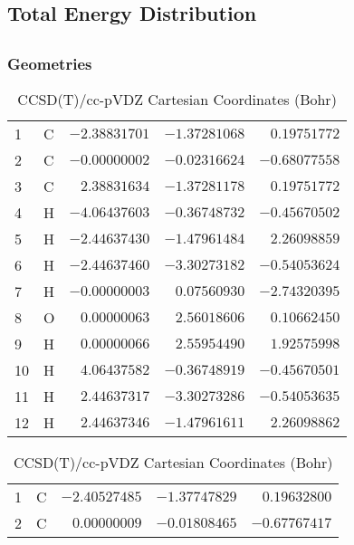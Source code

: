 \documentclass[10pt,oneside]{article}
\begin{document}
\begin{table}
\subsection*{Total Energy Distribution}
\centering\end{table}

\clearpage

\subsection{}

\begin{table}[h!]
\subsubsection*{Geometries}
\begin{multicols}{2}
\centering
\caption{CCSD(T)/cc-pVTZ Cartesian Coordinates (Bohr)}
\begin{tabular}{llrrr}
\toprule
1  & C  & $-2.38831701$ & $-1.37281068$ & $ 0.19751772$ \\
2  & C  & $-0.00000002$ & $-0.02316624$ & $-0.68077558$ \\
3  & C  & $ 2.38831634$ & $-1.37281178$ & $ 0.19751772$ \\
4  & H  & $-4.06437603$ & $-0.36748732$ & $-0.45670502$ \\
5  & H  & $-2.44637430$ & $-1.47961484$ & $ 2.26098859$ \\
6  & H  & $-2.44637460$ & $-3.30273182$ & $-0.54053624$ \\
7  & H  & $-0.00000003$ & $ 0.07560930$ & $-2.74320395$ \\
8  & O  & $ 0.00000063$ & $ 2.56018606$ & $ 0.10662450$ \\
9  & H  & $ 0.00000066$ & $ 2.55954490$ & $ 1.92575998$ \\
10 & H  & $ 4.06437582$ & $-0.36748919$ & $-0.45670501$ \\
11 & H  & $ 2.44637317$ & $-3.30273286$ & $-0.54053635$ \\
12 & H  & $ 2.44637346$ & $-1.47961611$ & $ 2.26098862$ \\
\bottomrule
\end{tabular}
\caption{CCSD(T)/cc-pVDZ Cartesian Coordinates (Bohr)}
\begin{tabular}{llrrr}
\toprule
1  & C  & $-2.40527485$ & $-1.37747829$ & $ 0.19632800$ \\
2  & C  & $ 0.00000009$ & $-0.01808465$ & $-0.67767417$ \\

\end{tabular}
\end{multicols}
\end{table}
\end{document}
